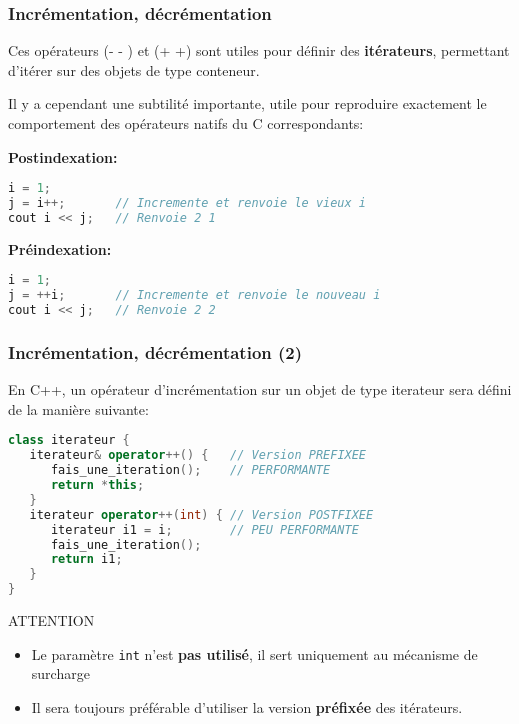 \documentclass{beamer}
\begin{document}
\begin{frame}[fragile=singleslide,shrink=20]
\frametitle {Incrémentation, décrémentation}

Ces opérateurs (- - ) et (+ +) sont utiles pour définir des \textbf{itérateurs}, permettant d'itérer sur des objets de type conteneur.

Il y a cependant une subtilité importante, utile pour reproduire exactement le comportement des opérateurs natifs du C correspondants:

\textbf{Postindexation:}
\begin{lstlisting}[language=c++]
i = 1;
j = i++;       // Incremente et renvoie le vieux i
cout i << j;   // Renvoie 2 1
\end{lstlisting}

\textbf{Préindexation:}
\begin{lstlisting}[language=c++]
i = 1;
j = ++i;       // Incremente et renvoie le nouveau i
cout i << j;   // Renvoie 2 2
\end{lstlisting}
\end{frame}

\begin{frame}[fragile=singleslide,shrink=20]
\frametitle {Incrémentation, décrémentation (2)}

En C++, un opérateur d'incrémentation sur un objet de type iterateur sera défini de la manière suivante:
\begin{lstlisting}[language=c++]
class iterateur {
   iterateur& operator++() {   // Version PREFIXEE
      fais_une_iteration();    // PERFORMANTE
      return *this;
   }
   iterateur operator++(int) { // Version POSTFIXEE
      iterateur i1 = i;        // PEU PERFORMANTE
      fais_une_iteration();
      return i1;
   }
}
\end{lstlisting}
\begin{block}{ATTENTION}
\begin{itemize}
   \item{Le paramètre \texttt{int} n'est \textbf{pas utilisé}, il sert uniquement au mécanisme de surcharge}
   \item{Il sera toujours préférable d'utiliser la version \textbf{préfixée} des itérateurs.}
\end{itemize}
\end{block}
\end{frame}
\end{document}
